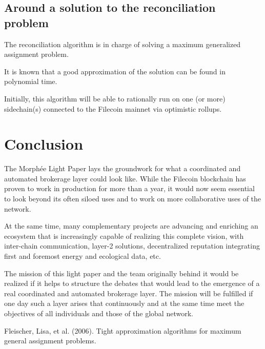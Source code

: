 \documentclass[twoside,twocolumn]{article}
\begin{document}
\subsection{Around a solution to the reconciliation problem}

The reconciliation algorithm is in charge of solving a maximum generalized assignment problem.

It is known that a good approximation of the solution can be found in polynomial time. \cite{Fleischer:2006}

Initially, this algorithm will be able to rationally run on one (or more) sidechain(s) connected to the Filecoin mainnet via optimistic rollups.


\section{Conclusion}

The Morphée Light Paper lays the groundwork for what a coordinated and automated
brokerage layer could look like.
While the Filecoin blockchain has proven to work in production for more than a year,
it would now seem essential to look beyond its often siloed uses and to work on more collaborative uses of the network.

At the same time, many complementary projects are advancing and enriching an ecosystem that is increasingly capable
of realizing this complete vision, with inter-chain communication, layer-2 solutions, decentralized reputation
integrating first and foremost energy and ecological data, etc.

The mission of this light paper and the team originally behind it would be realized if it helps to structure
the debates that would lead to the emergence of a real coordinated and automated brokerage layer.
The mission will be fulfilled if one day such a layer arises that continuously and at the same time meet the objectives
of all individuals and those of the global network.



\begin{thebibliography}{99} %

Fleischer, Lisa, et al. (2006).
\newblock Tight approximation algorithms for maximum general assignment problems.

\end{thebibliography}

\end{document}
